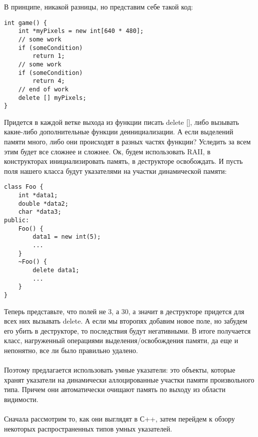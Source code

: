 \documentclass {article}
\begin{document}
В принципе, никакой разницы, но представим себе такой код:
\begin{lstlisting}[caption=Пример]
int game() {
    int *myPixels = new int[640 * 480];
    // some work
    if (someCondition)
        return 1;        
    // some work
    if (someCondition)
        return 4;        
    // end of work
    delete [] myPixels;
}
\end{lstlisting}
Придется в каждой ветке выхода из функции писать delete [], либо вызывать какие-либо дополнительные функции деинициализации. А если выделений памяти много, либо они происходят в разных частях функции? Уследить за всем этим будет все сложнее и сложнее. Ок, будем использовать RAII, в конструкторах инициализировать память, в деструкторе освобождать. И пусть поля нашего класса будут указателями на участки динамической памяти:
\begin{lstlisting}[caption=Пример]
class Foo {
    int *data1;
    double *data2;
    char *data3;
public:
    Foo() {
        data1 = new int(5);
        ...
    }
    ~Foo() {
        delete data1;
        ...
    }
}
\end{lstlisting}
Теперь представьте, что полей не 3, а 30, а значит в деструкторе придется для всех них вызывать delete. А если мы второпях добавим новое поле, но забудем его убить в деструкторе, то последствия будут негативными. В итоге получается класс, нагруженный операциями выделения/освобождения памяти, да еще и непонятно, все ли было правильно удалено.\\\\
Поэтому предлагается использовать умные указатели: это объекты, которые хранят указатели на динамически аллоцированные участки памяти произвольного типа. Причем они автоматически очищают память по выходу из области видимости.\\\\
Сначала рассмотрим то, как они выглядят в С++, затем перейдем к обзору некоторых распространенных типов умных указателей.
\end{document}
